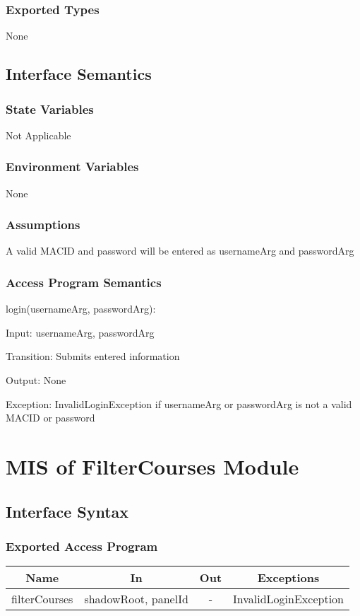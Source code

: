 \documentclass[12pt, titlepage]{article}
\begin{document}
\subsubsection{Exported Types}
None
\subsection{Interface Semantics}
\subsubsection{State Variables}
Not Applicable
\subsubsection{Environment Variables}
None
\subsubsection{Assumptions}
A valid MACID and password will be entered as usernameArg and passwordArg

\subsubsection{Access Program Semantics}
login(usernameArg, passwordArg):

    Input: usernameArg, passwordArg

    Transition: Submits entered information

    Output: None

    Exception: InvalidLoginException if usernameArg or passwordArg is not a valid MACID or password


\newpage




\section{MIS of FilterCourses Module}
\subsection{Interface Syntax}
\subsubsection{Exported Access Program}
\begin{tabular}[pos]{|c|c|c|c|}
    \hline
    \textbf{Name}& \textbf{In} & \textbf{Out} & \textbf{Exceptions} \\ \hline
    filterCourses & shadowRoot, panelId & - & InvalidLoginException \\ \hline
\end{tabular}
\end{document}
